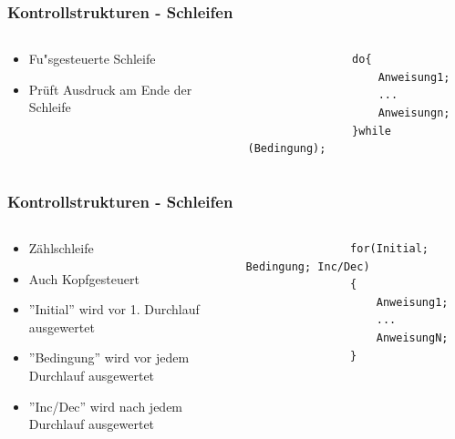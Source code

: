 \begin{frame}[fragile]
	\frametitle{Kontrollstrukturen - Schleifen}
	\begin{columns}
		\begin{column}{0.5\textwidth}
			\begin{itemize}
			  \item Fu"sgesteuerte Schleife
			  \item Pr\"uft Ausdruck am Ende der Schleife 
			\end{itemize}
		\end{column}
		\begin{column}{0.5\textwidth}
			\begin{lstlisting}
				do{
					Anweisung1;
					...
					Anweisungn;
				}while (Bedingung);
			\end{lstlisting}
		\end{column}
	\end{columns}
\end{frame}

\begin{frame}[fragile]
	\frametitle{Kontrollstrukturen - Schleifen}
	\begin{columns}
		\begin{column}{0.5\textwidth}
			\begin{itemize}
				  \item Z\"ahlschleife
				  \item Auch Kopfgesteuert
				  \item ''Initial'' wird vor 1. Durchlauf ausgewertet
				  \item ''Bedingung'' wird vor jedem Durchlauf ausgewertet
				  \item ''Inc/Dec'' wird nach jedem Durchlauf ausgewertet
				\end{itemize}
			\end{column}
		\begin{column}{0.5\textwidth}
			\begin{lstlisting}
				for(Initial; Bedingung; Inc/Dec)
				{
					Anweisung1;
					...
					AnweisungN;
				}
			\end{lstlisting}
		\end{column}
	\end{columns}
\end{frame}

